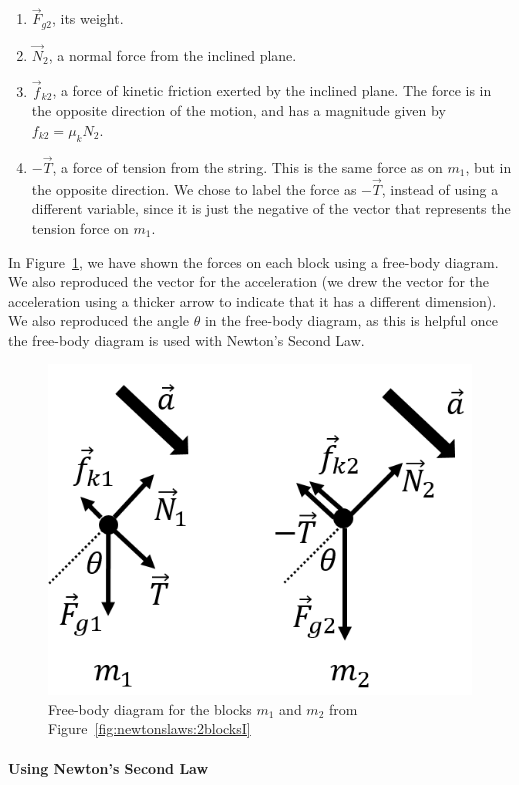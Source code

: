 \begin{framed}
\begin{framed}
\begin{enumerate}
\item $\vec F_{g2}$, its weight.
\item $\vec N_2$, a normal force from the inclined plane.
\item $\vec f_{k2}$, a force of kinetic friction exerted by the inclined plane. The force is in the opposite direction of the motion, and has a magnitude given by $f_{k2}=\mu_kN_2$.
\item $-\vec T$, a force of tension from the string. This is the same force as on $m_1$, but in the opposite direction. We chose to label the force as $-\vec T$, instead of using a different variable, since it is just the negative of the vector that represents the tension force on $m_1$.
\end{enumerate}

In Figure~\ref{fig:newtonslaws:2blocksI_fbd}, we have shown the forces on each block using a free-body diagram. We also reproduced the vector for the acceleration (we drew the vector for the acceleration using a thicker arrow to indicate that it has a different dimension). We also reproduced the angle $\theta$ in the free-body diagram, as this is helpful once the free-body diagram is used with Newton's Second Law.

\begin{figure}[!htbp]
\centering
\includegraphics[width=0.5\linewidth]{files/2blocksI_fbd-f77c2b42d2da1e66c936f771cec3aa4d.png}
\caption[]{Free-body diagram for the blocks $m_1$ and $m_2$ from Figure~\ref{fig:newtonslaws:2blocksI}}
\label{fig:newtonslaws:2blocksI_fbd}
\end{figure}
\end{framed}
\end{framed}

\paragraph{Using Newton's Second Law}

